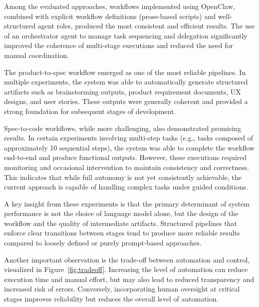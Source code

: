 \documentclass[a4paper,12pt]{report}
\begin{document}
Among the evaluated approaches, workflows implemented using OpenClaw, combined with explicit workflow definitions (prose-based scripts) and well-structured agent roles, produced the most consistent and efficient results. The use of an orchestrator agent to manage task sequencing and delegation significantly improved the coherence of multi-stage executions and reduced the need for manual coordination.

The product-to-spec workflow emerged as one of the most reliable pipelines. In multiple experiments, the system was able to automatically generate structured artifacts such as brainstorming outputs, product requirement documents, UX designs, and user stories. These outputs were generally coherent and provided a strong foundation for subsequent stages of development.

Spec-to-code workflows, while more challenging, also demonstrated promising results. In certain experiments involving multi-step tasks (e.g., tasks composed of approximately 10 sequential steps), the system was able to complete the workflow end-to-end and produce functional outputs. However, these executions required monitoring and occasional intervention to maintain consistency and correctness. This indicates that while full autonomy is not yet consistently achievable, the current approach is capable of handling complex tasks under guided conditions.

A key insight from these experiments is that the primary determinant of system performance is not the choice of language model alone, but the design of the workflow and the quality of intermediate artifacts. Structured pipelines that enforce clear transitions between stages tend to produce more reliable results compared to loosely defined or purely prompt-based approaches.

Another important observation is the trade-off between automation and control, visualized in Figure~\ref{fig:tradeoff}. Increasing the level of automation can reduce execution time and manual effort, but may also lead to reduced transparency and increased risk of errors. Conversely, incorporating human oversight at critical stages improves reliability but reduces the overall level of automation.
\end{document}
